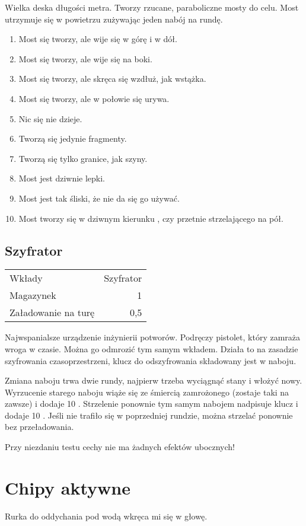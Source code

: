 Wielka deska długości metra.
Tworzy rzucane, paraboliczne mosty do celu.
Most utrzymuje się w powietrzu zużywając jeden nabój na rundę.
\begin{enumerate}
	\item Most się tworzy, ale wije się w górę i w dół.
	\item Most się tworzy, ale wije się na boki.
	\item Most się tworzy, ale skręca się wzdłuż, jak wstążka.
	\item Most się tworzy, ale w połowie się urywa.
	\item Nic się nie dzieje.
	\item Tworzą się jedynie fragmenty.
	\item Tworzą się tylko granice, jak szyny. 
	\item Most jest dziwnie lepki.
	\item Most jest tak śliski, że nie da się go używać.
	\item Most tworzy się w dziwnym kierunku \dii{}, czy przetnie strzelającego na pół.
\end{enumerate}

\subsection{Szyfrator \abt{}}

\begin{tabular}{lr}
Wkłady & Szyfrator \\
Magazynek & 1 \\
Załadowanie na turę & 0,5 \\
\end{tabular}

Najwspanialsze urządzenie inżynierii potworów.
Podręczy pistolet, który zamraża wroga w czasie.
Można go odmrozić tym samym wkładem.
Działa to na zasadzie szyfrowania czasoprzestrzeni, klucz do odszyfrowania składowany jest w naboju.

Zmiana naboju trwa dwie rundy, najpierw trzeba wyciągnąć stany i włożyć nowy.
Wyrzucenie starego naboju wiąże się ze śmiercią zamrożonego (zostaje taki na zawsze) i dodaje 10 \abgrz{}.
Strzelenie ponownie tym samym nabojem nadpisuje klucz i dodaje 10 \abgrz{}.
Jeśli nie trafiło się w poprzedniej rundzie, można strzelać ponownie bez przeładowania.

Przy niezdaniu testu cechy nie ma żadnych efektów ubocznych!

\section{Chipy aktywne}
Rurka do oddychania pod wodą wkręca mi się w głowę.

